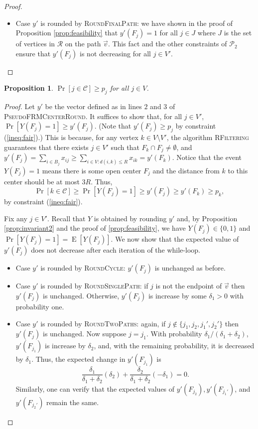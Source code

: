 \documentclass[a4paper,11pt]{article}
\newtheorem{proposition}[theorem]{Proposition}
\DeclareMathOperator*{\E}{\mathrm{E}}
\newcommand{\C}{\mathcal{C}}
\newcommand{\R}{\mathcal{R}}
\renewcommand{\P}{\mathcal{P}}
\begin{document}
\begin{proof}
\begin{itemize}
	\item Case $y'$ is rounded by \textsc{RoundFinalPath}: we have shown in the proof of Proposition \ref{prop:feasibility} that $y'(F_j) = 1$ for all $j \in J$ where $J$ is the set of vertices in $\R$ on the path $\vec{v}$. This fact and the other constraints of $\P_2$ ensure that $y'(F_j)$ is not decreasing for all $j \in V'$.
	
	
\end{itemize}
\end{proof}

\begin{proposition} $\Pr[j \in \C] \geq p_j$ for all $j \in V$.
\end{proposition}
\begin{proof} Let $y'$ be the vector defined as in lines $2$ and $3$ of \textsc{PseudoFRMCenterRound}. It suffices to show that, for all $j \in V'$, $\Pr[Y(F_j) = 1] \geq y'(F_j)$. (Note that $y'(F_j) \geq p_j$ by constraint (\ref{ineq:fair}).) This is because, for any vertex $k \in V \setminus V'$, the algorithm \textsc{RFiltering} guarantees that there exists $j \in V'$ such that $F_k \cap F_j \neq \emptyset$, and $y'(F_j) = \sum_{i \in B_j} x_{ij} \geq  \sum_{i \in V: d(i,k) \leq R} x_{ik} = y'(F_k)$. Notice that the event $Y(F_j)=1$ means there is some open center $F_j$ and the distance from $k$ to this center should be at most $3R$. Thus,  
$$\Pr[k \in \C] \geq \Pr[Y(F_j)=1] \geq y'(F_j) \geq y'(F_k) \geq p_k,$$ 
by constraint (\ref{ineq:fair}).

Fix any $j \in V'$. Recall that $Y$ is obtained by rounding $y'$ and, by Proposition \ref{prop:invariant2} and the proof of \ref{prop:feasibility}, we have $Y(F_j) \in \{0,1\}$ and $\Pr[Y(F_j)=1] = \E[Y(F_j)]$. We now show that the expected value of $y'(F_j)$ does not decrease after each iteration of the while-loop.
\begin{itemize}
	\item Case $y'$ is rounded by \textsc{RoundCycle}: $y'(F_j)$ is unchanged as before.
\item Case $y'$ is rounded by \textsc{RoundSinglePath}: if $j$ is not the endpoint of $\vec{v}$ then $y'(F_j)$ is unchanged. Otherwise, $y'(F_j)$ is increase by some $\delta_1 > 0$ with probability one.
	\item Case $y'$ is rounded by \textsc{RoundTwoPaths}: again, if $j \notin \{j_1, j_2, j_1', j_2'\}$ then $y'(F_j)$ is unchanged. Now suppose $j = j_1$. With probability $\delta_1/(\delta_1+\delta_2)$, $y'(F_{j_1})$ is increase by $\delta_2$, and, with the remaining probability, it is decreased by $\delta_1$. Thus, the expected change in $y'(F_{j_1})$ is 
	$$\frac{\delta_1}{\delta_1+\delta_2}(\delta_2) + \frac{\delta_2}{\delta_1+\delta_2}(-\delta_1) = 0. $$
Similarly, one can verify that the expected values of $y'(F_{j_2}), y'(F_{j_1'})$, and $ y'(F_{j_2'})$ remain the same.


\end{itemize}
\end{proof}
\end{document}

